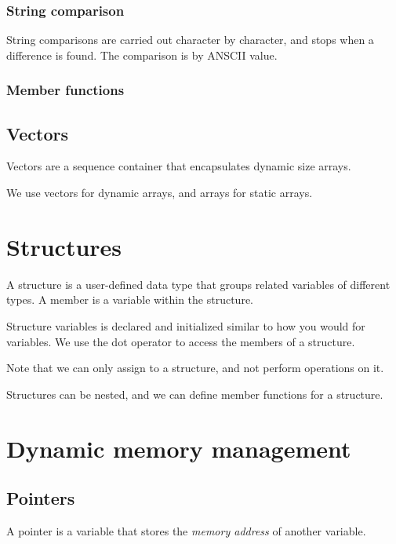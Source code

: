 \documentclass{article}
\begin{document}
\subsubsection{String comparison}
String comparisons are carried out character by character, and stops when a difference is found. The comparison is by ANSCII value.


\subsubsection{Member functions}


\subsection{Vectors}
Vectors are a sequence container that encapsulates dynamic size arrays.

We use vectors for dynamic arrays, and arrays for static arrays.

\section{Structures}
A structure is a user-defined data type that groups related variables of different types. A member is a variable within the structure.

Structure variables is declared and initialized similar to how you would for variables. We use the dot operator to access the members of a structure.

Note that we can only assign to a structure, and not perform operations on it.

Structures can be nested, and we can define member functions for a structure.


\section{Dynamic memory management}
\label{sec:pointers}
\subsection{Pointers}
A pointer is a variable that stores the \emph{memory address} of another variable.
\end{document}
